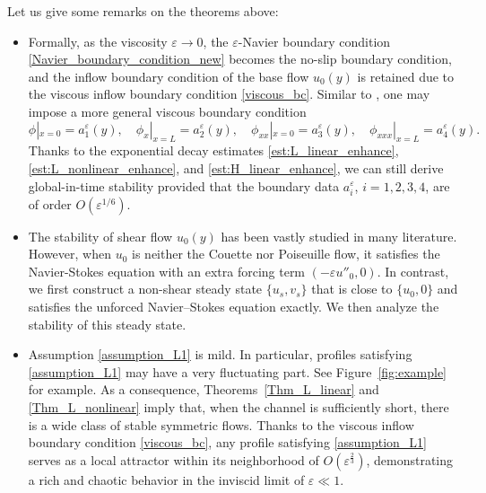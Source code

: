 \documentclass[reqno, 11pt]{amsart}
\theoremstyle{plain}
\theoremstyle{definition}
\theoremstyle{remark}
\numberwithin{equation}{section}
\begin{document}
Let us give some remarks on the theorems above:
\begin{itemize}
\item Formally, as the viscosity $\varepsilon \to 0$, the $\varepsilon$-Navier boundary condition \eqref{Navier_boundary_condition_new} becomes the no-slip boundary condition, and the inflow boundary condition of the base flow $u_0(y)$ is retained due to the viscous inflow boundary condition \eqref{viscous_bc}. Similar to \cite{GuoIyer23}, one may impose a more general viscous boundary condition
$$
\phi|_{x=0} = a_1^\varepsilon(y), \quad \phi_x|_{x=L} = a_2^\varepsilon(y), \quad \phi_{xx}|_{x=0} = a_3^\varepsilon(y), \quad \phi_{xxx}|_{x=L} = a_4^\varepsilon(y).
$$
Thanks to the exponential decay estimates \eqref{est:L_linear_enhance}, \eqref{est:L_nonlinear_enhance}, and \eqref{est:H_linear_enhance}, we can still derive global-in-time stability provided that the boundary data $a^\varepsilon_i$, $i=1,2,3,4$, are of order $O(\varepsilon^{1/6})$.
\\
\item The stability of shear flow $u_0(y)$ has been vastly studied in many literature. However, when $u_0$ is neither the Couette nor Poiseuille flow, it satisfies the Navier-Stokes equation with an extra forcing term $(-\varepsilon u''_0, 0)$. In contrast, we first construct a non-shear steady state $\{u_s,v_s\}$ that is close to $\{u_0, 0\}$ and satisfies the unforced Navier–Stokes equation exactly. We then analyze the stability of this steady state.\\
\item Assumption \eqref{assumption_L1} is mild. In particular, profiles satisfying \eqref{assumption_L1} may have a very fluctuating part. See Figure~\ref{fig:example} for example. As a consequence, Theorems~\ref{Thm_L_linear} and \ref{Thm_L_nonlinear} imply that, when the channel is sufficiently short, there is a wide class of stable symmetric flows. Thanks to the viscous inflow boundary condition \eqref{viscous_bc}, any profile satisfying \eqref{assumption_L1} serves as a local attractor within its neighborhood of $O(\varepsilon^{\frac{2}{3}})$, demonstrating a rich and chaotic behavior in the inviscid limit of $\varepsilon \ll 1$.

\begin{figure}[h]
\end{figure}
\end{itemize}
\end{document}
